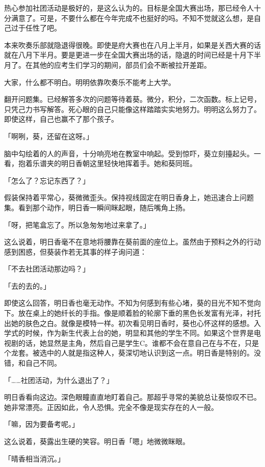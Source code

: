 \documentclass[UTF8]{ctexart}
\begin{document}
    热心参加社团活动是极好的，是这么认为的。目标是全国大赛出场，那已经令人十分满意了。可是，不要什么都在今年完成不也挺好的吗。不知不觉就这么想，是自己过于任性了吧。

    本来吹奏乐部就隐退得很晚。即使是府大赛也在八月上半月，如果是关西大赛的话就在八月下半月。要是更进一步在全国大赛出场的话，隐退的时间已经是十月下半月了。在其他的应考生们学习的期间，部员们会不断被拉开差距。

    大家，什么都不明白。明明依靠吹奏乐不能考上大学。

    翻开问题集。已经解答多次的问题等待着葵。微分，积分，二次函数。标上记号，只凭己力书写解答。死心眼的自己只能像这样踏踏实实地努力。明明这么努力了。即使这样，自己也赢不了那个孩子。

    「啊咧，葵，还留在这呀。」

    脑中勾绘着的人的声音，十分响亮地在教室中响起。受到惊吓，葵立刻擡起头。一看，抱着乐谱夹的明日香朝这里轻快地挥着手。她和葵同班。

    「怎么了？忘记东西了？」

    假装保持着平常心，葵微微歪头。保持视线固定在明日香身上，她迅速合上问题集。看到那个动作，明日香一瞬间眯起眼，随后嘴角上扬。

    「呀，把笔盒忘了。所以急匆匆地过来拿了。」

    这么说着，明日香毫不在意地将腰靠在葵前面的座位上。虽然由于预料之外的行动感到困惑，但葵装作若无其事的样子询问道：

    「不去社团活动那边吗？」

    「去的去的。」

    即使这么回答，明日香也毫无动作。不知为何感到有些心堵，葵的目光不知不觉向下。放在桌上的她纤长的手指。像是顺着脸的轮廓下垂的黑色长发富有光泽，衬托出她的肤色之白。就像是模特一样。初次看见明日香时，葵也心怀这样的感想。入学式的时候，作为新生代表上台的她，明显和其他的学生不同。如果这个世界是电视剧的话，她显然是主角，然后自己是学生C。谁都不会在意自己在与不在，只是个龙套。被选中的人就是指这种人，葵深切地认识到这一点。明日香是特别的。没错，和自己不同。

    「……社团活动，为什么退出了？」

    明日香看向这边。深色眼瞳直直地盯着自己。那超乎寻常的美貌总让葵惊叹不已。她非常漂亮。正因如此，令人恐惧。完全不像是现实存在的人一般。

    「嘛，因为要备考呢。」

    这么说着，葵露出生硬的笑容。明日香「嗯」地微微眯眼。

    「晴香相当消沉。」
\end{document}
